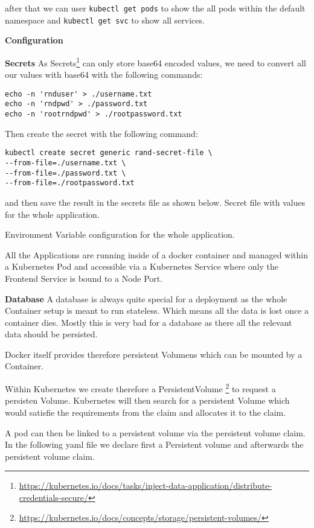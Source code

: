 after that we can user \texttt{kubectl get pods} to show the all pods within the default namespace and \texttt{kubectl get svc} to show all services.


\textbf{Configuration}

\textbf{Secrets}
As Secrets\footnote{\url{https://kubernetes.io/docs/tasks/inject-data-application/distribute-credentials-secure/}} can only store base64 encoded values, we need to convert all our values with base64 with the following commands:
\begin{verbatim}
echo -n 'rnduser' > ./username.txt
echo -n 'rndpwd' > ./password.txt
echo -n 'rootrndpwd' > ./rootpassword.txt
\end{verbatim}

Then create the secret with the following command:
\begin{verbatim}
kubectl create secret generic rand-secret-file \
--from-file=./username.txt \
--from-file=./password.txt \
--from-file=./rootpassword.txt
\end{verbatim}

and then save the result in the secrets file as shown below.
Secret file with values for the whole application.


Environment Variable configuration for the whole application.


All the Applications are running inside of a docker container and managed within a Kubernetes Pod and accessible via a Kubernetes Service where only the Frontend Service is bound to a Node Port.

\textbf{Database}
A database is always quite special for a deployment as the whole Container setup is meant to run stateless. Which means all the data is lost once a container dies. Mostly this is very bad for a database as there all the relevant data should be persisted.

Docker itself provides therefore persistent Volumens which can be mounted by a Container.

Within Kubernetes we create therefore a PersistentVolume \footnote{\url{https://kubernetes.io/docs/concepts/storage/persistent-volumes/}} to request a persisten Volume. Kubernetes will then search for a persistent Volume which would satisfie the requirements from the claim and allocates it to the claim.

A pod can then be linked to a persistent volume via the persistent volume claim.
In the following yaml file we declare first a Persistent volume and afterwards the persistent volume claim.


